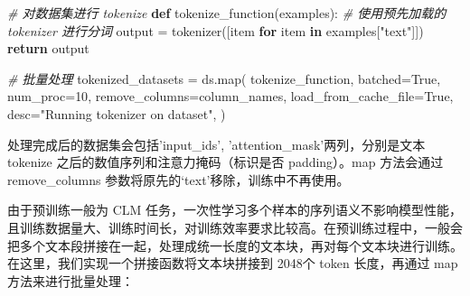 \documentclass[
]{article}
\newenvironment{Shaded}{}{}
\newcommand{\BuiltInTok}[1]{\textcolor[rgb]{0.00,0.50,0.00}{#1}}
\newcommand{\CommentTok}[1]{\textcolor[rgb]{0.38,0.63,0.69}{\textit{#1}}}
\newcommand{\ControlFlowTok}[1]{\textcolor[rgb]{0.00,0.44,0.13}{\textbf{#1}}}
\newcommand{\DecValTok}[1]{\textcolor[rgb]{0.25,0.63,0.44}{#1}}
\newcommand{\KeywordTok}[1]{\textcolor[rgb]{0.00,0.44,0.13}{\textbf{#1}}}
\newcommand{\NormalTok}[1]{#1}
\newcommand{\OperatorTok}[1]{\textcolor[rgb]{0.40,0.40,0.40}{#1}}
\newcommand{\StringTok}[1]{\textcolor[rgb]{0.25,0.44,0.63}{#1}}
\newcommand{\VariableTok}[1]{\textcolor[rgb]{0.10,0.09,0.49}{#1}}
\begin{document}
\begin{Shaded}
\begin{Highlighting}[]
\CommentTok{\# 对数据集进行 tokenize}
\KeywordTok{def}\NormalTok{ tokenize\_function(examples):}
    \CommentTok{\# 使用预先加载的 tokenizer 进行分词}
\NormalTok{    output }\OperatorTok{=}\NormalTok{ tokenizer([item }\ControlFlowTok{for}\NormalTok{ item }\KeywordTok{in}\NormalTok{ examples[}\StringTok{"text"}\NormalTok{]])}
    \ControlFlowTok{return}\NormalTok{ output}

\CommentTok{\# 批量处理}
\NormalTok{tokenized\_datasets }\OperatorTok{=}\NormalTok{ ds.}\BuiltInTok{map}\NormalTok{(}
\NormalTok{    tokenize\_function,}
\NormalTok{    batched}\OperatorTok{=}\VariableTok{True}\NormalTok{,}
\NormalTok{    num\_proc}\OperatorTok{=}\DecValTok{10}\NormalTok{,}
\NormalTok{    remove\_columns}\OperatorTok{=}\NormalTok{column\_names,}
\NormalTok{    load\_from\_cache\_file}\OperatorTok{=}\VariableTok{True}\NormalTok{,}
\NormalTok{    desc}\OperatorTok{=}\StringTok{"Running tokenizer on dataset"}\NormalTok{,}
\NormalTok{)}
\end{Highlighting}
\end{Shaded}

处理完成后的数据集会包括'input\_ids', 'attention\_mask'两列，分别是文本
tokenize 之后的数值序列和注意力掩码（标识是否 padding）。map 方法会通过
remove\_columns 参数将原先的`text'移除，训练中不再使用。

由于预训练一般为 CLM
任务，一次性学习多个样本的序列语义不影响模型性能，且训练数据量大、训练时间长，对训练效率要求比较高。在预训练过程中，一般会把多个文本段拼接在一起，处理成统一长度的文本块，再对每个文本块进行训练。在这里，我们实现一个拼接函数将文本块拼接到
2048个 token 长度，再通过 map 方法来进行批量处理：
\end{document}
